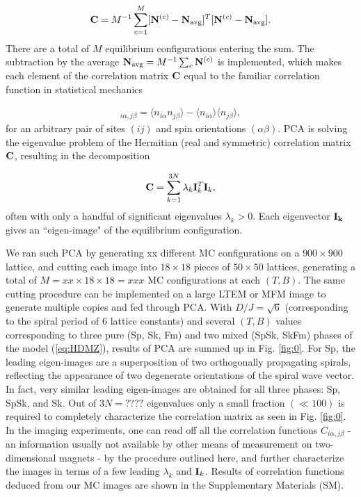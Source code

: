 \documentclass[reprint,amsmath,amssymb,aps,showpacs,superscriptaddress,prl]{revtex4-1}
\newcommand{\ba}{\begin{eqnarray}}
\newcommand{\ea}{\end{eqnarray}}
\renewcommand{\v}[1]{{\bf #1}}
\begin{document}
\ba {\bf C} = M^{-1} \sum_{c=1}^M [ \v N^{(c)} - \v N_{\rm avg} ]^T  [ \v N^{(c)} - \v N_{\rm avg} ] . \ea
There are a total of $M$ equilibrium configurations entering the sum. The subtraction by the average $\v N_{\rm avg} = M^{-1} \sum_c \v N^{(c)}$ is implemented, which makes each element of the correlation matrix ${\bf C}$ equal to the familiar correlation function in statistical mechanics

\ba [ {\bf C} ]_{i \alpha, j \beta} = \langle n_{i\alpha} n_{j\beta} \rangle - \langle n_{i\alpha} \rangle \langle n_{j\beta} \rangle, \ea
%
for an arbitrary pair of sites $(ij)$ and spin orientations $(\alpha\beta)$. PCA is solving the eigenvalue problem of the Hermitian (real and symmetric) correlation matrix ${\bf C}$, resulting in the decomposition

\ba {\bf C} = \sum_{k=1}^{3N} \lambda_k \v I_k^T \v I_k  , \label{eq:PCA} \ea
often with only a handful of significant eigenvalues $\lambda_k > 0$. Each eigenvector $\bf I_k$ gives an ``eigen-image" of the equilibrium configuration.

We ran such PCA by generating xx different MC configurations on a $900\times 900$ lattice, and cutting each image into $18\times18$ pieces of $50\times50$ lattices, generating a total of $M = xx \times 18\times 18 = xxx$ MC configurations at each $(T,B)$. The same cutting procedure can be implemented on a large LTEM or MFM image to generate multiple copies and fed through PCA. With $D/J=\sqrt{6}$ (corresponding to the spiral period of 6 lattice constants) and several $(T,B)$ values corresponding to three pure (Sp, Sk, Fm) and two mixed (SpSk, SkFm) phases of the model (\ref{eq:HDMZ}), results of PCA are summed up in Fig. \ref{fig:0}. For Sp, the leading eigen-images are a superposition of two orthogonally propagating spirals, reflecting the appearance of two degenerate orientations of the spiral wave vector. In fact, very similar leading eigen-images are obtained for all three phases: Sp, SpSk, and Sk. Out of $3N=????$ eigenvalues only a small fraction $(\ll 100)$ is required to completely characterize the correlation matrix as seen in Fig. \ref{fig:0}. In the imaging experiments, one can read off all the correlation functions $C_{i\alpha, j\beta}$ - an information usually not available by other means of measurement on two-dimensional magnets - by the procedure outlined here, and further characterize the images in terms of a few leading $\lambda_k$ and ${\bf I}_k$. Results of correlation functions deduced from our MC images are shown in the Supplementary Materials (SM).
\end{document}
